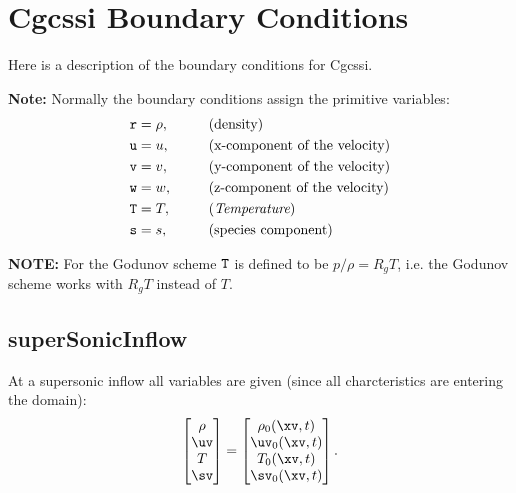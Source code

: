 \section{Cgcssi Boundary Conditions} \label{sec:cgcssiBC}

Here is a description of the boundary conditions for Cgcssi.

{\bf Note:} Normally the boundary conditions assign the primitive variables:
\begin{alignat}{3}
  {\tt r} &= \rho , \qquad&&\text{(density)} \\
  {\tt u} &= u,    &&\text{(x-component of the velocity)} \\
  {\tt v} &= v ,   &&\text{(y-component of the velocity)}\\
  {\tt w} &= w ,   &&\text{(z-component of the velocity)}\\
  {\tt T} &= T,    &&\text{({\em Temperature})} \\
  {\tt s} &= s,    &&\text{(species component)}
\end{alignat}

{\bf NOTE:} For the Godunov scheme ${\tt T}$ is defined to be $p/\rho = R_g T$, i.e. the Godunov scheme
works with $R_g T$ instead of $T$.



\subsection{superSonicInflow} \label{sec:bc:superSonicInflow}

At a supersonic inflow all variables are given (since all charcteristics are entering the domain):
\begin{align}
   \begin{bmatrix}
       \rho \\
       \uv  \\
       T    \\
       \sv  
   \end{bmatrix}
  = 
   \begin{bmatrix}
       \rho_0(\xv,t) \\
       \uv_0(\xv,t)  \\
       T_0 (\xv,t)   \\
       \sv_0(\xv,t)  
   \end{bmatrix}.
\end{align}

